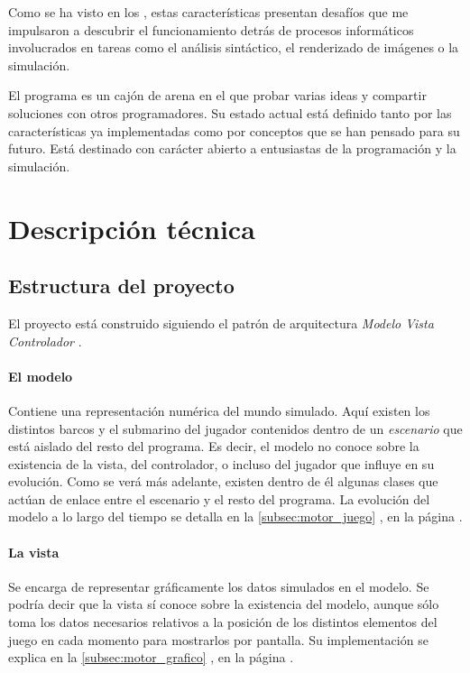 \documentclass[a4paper,
	11pt,
	parskip=full,
	bibliography=totoc,
	twoside
	]{scrartcl}
\let\oldsection\section
\def\section{\cleardoubleoddpage\oldsection}
\begin{document}
	Como se ha visto en los , estas características presentan desafíos que me impulsaron a descubrir el funcionamiento detrás de procesos informáticos involucrados en tareas como el análisis sintáctico, el renderizado de imágenes o la simulación.
	
	El programa es un cajón de arena en el que probar varias ideas y compartir soluciones con otros programadores. Su estado actual está definido tanto por las características ya implementadas como por conceptos que se han pensado para su futuro. Está destinado con carácter abierto a entusiastas de la programación y la simulación.

\section{Descripción técnica}
\label{sec:desc_tecnica}
	\subsection{Estructura del proyecto}
	\label{subsec:estructura}
		El proyecto está construido siguiendo el patrón de arquitectura \textit{Modelo Vista Controlador} \cite{tutorialspoint_mvc}.
		
		\paragraph{El modelo}
			Contiene una representación numérica del mundo simulado. Aquí existen los distintos barcos y el submarino del jugador contenidos dentro de un \textit{escenario} que está aislado del resto del programa. Es decir, el modelo no conoce sobre la existencia de la vista, del controlador, o incluso del jugador que influye en su evolución. Como se verá más adelante, existen dentro de él algunas clases que actúan de enlace entre el escenario y el resto del programa. La evolución del modelo a lo largo del tiempo se detalla en la \autoref{subsec:motor_juego} , en la página \pageref{subsec:motor_juego}.
					
		\paragraph{La vista}
			Se encarga de representar gráficamente los datos simulados en el modelo. Se podría decir que la vista sí conoce sobre la existencia del modelo, aunque sólo toma los datos necesarios relativos a la posición de los distintos elementos del juego en cada momento para mostrarlos por pantalla. Su implementación se explica en la \autoref{subsec:motor_grafico} , en la página \pageref{subsec:motor_grafico}.
			
\end{document}
